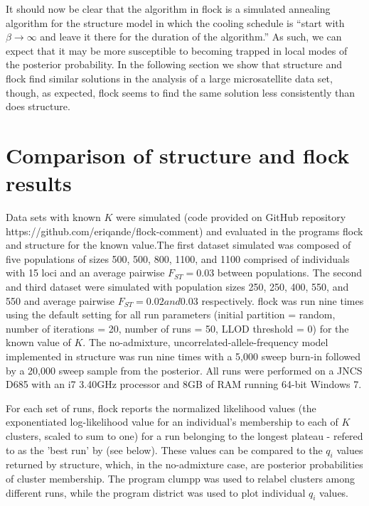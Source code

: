 It should now be clear that the algorithm in {\sc flock} is a simulated annealing 
algorithm for the {\sc structure} model in which the cooling schedule is
``start with $\beta\rightarrow\infty$ and leave it there for the duration of 
the algorithm.''  As such, we can expect that it may be more susceptible 
to becoming trapped in local modes of the posterior probability. 
In the following section we show that {\sc structure} and {\sc flock} find similar
solutions in the analysis of a large microsatellite data set, though, as expected,
{\sc flock} seems to find the same solution less consistently than does {\sc structure}.



\section*{Comparison of {\sc structure} and {\sc flock} results}
Data sets with known $K$ were simulated
(code provided on GitHub repository https://github.com/eriqande/flock-comment)
and evaluated in the programs {\sc flock} and {\sc structure} 
for the known value.The first dataset simulated was composed of five populations of 
sizes 500, 500, 800, 1100, and 1100 comprised of individuals 
with 15 loci and an average pairwise $F_{ST} = 0.03$ between populations. 
The second and third dataset were simulated with population sizes
250, 250, 400, 550, and 550 and average pairwise $F_{ST} = 0.02 and 0.03$
respectively. {\sc flock} was run nine times using the default setting for all 
run parameters (initial partition = random, number of iterations = 20, number of runs = 50, 
LLOD threshold = 0) for the known value of $K$. The no-admixture, 
uncorrelated-allele-frequency model implemented in {\sc structure} was run nine times with 
a 5,000 sweep burn-in followed by a 20,000 sweep sample from the posterior. 
All runs were performed on a JNCS D685 with an i7 3.40GHz processor and 8GB
of RAM running 64-bit Windows 7. 

For each set of runs, {\sc flock} reports the 
normalized likelihood values (the exponentiated log-likelihood value for an individual's 
membership to each of $K$ clusters, scaled to sum to one) for a run belonging to the 
longest plateau - refered to as the 'best run' by \citep{Duc&Tur2012} (see below).
These values can be compared to the $q_i$ values
returned by {\sc structure}, which, in the no-admixture case, are posterior probabilities of cluster membership.
The program {\sc clumpp} \citep{Jak&Ros2007} was used to relabel clusters among different runs,
while the program {\sc district} \citep{Rosenberg2004} was used to plot individual \textit{$q_i$} values.

